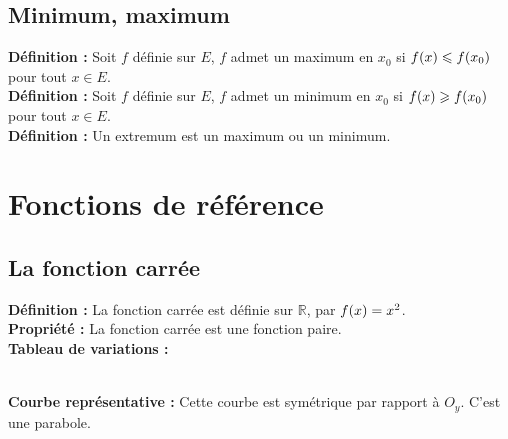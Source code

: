 \documentclass[a4paper,titlepage]{article}
\makeatletter
\let\oldsection\section
\renewcommand\section{\clearpage\oldsection}
\let\oldleft\left
\renewcommand{\left}{\mathopen{}\mathclose\bgroup\oldleft}
\let\oldright\right
\renewcommand{\right}{\aftergroup\egroup\oldright}
\def\tikzscale{1}\begin{lrbox}{\measure@tikzpicture}
\edef\tikzscale{\pgfmathresult}
\makeatother
\begin{document}
    \subsection{Minimum, maximum}
        \textbf{Définition :} Soit $f$ définie sur $E$, $f$ admet un maximum en $x_{0}$ si $f\left(x\right)\leqslant f\left(x_{0}\right)$ pour tout $x\in E$.
        \\
        \textbf{Définition :} Soit $f$ définie sur $E$, $f$ admet un minimum en $x_{0}$ si $f\left(x\right)\geqslant f\left(x_{0}\right)$ pour tout $x\in E$.
        \\
        \textbf{Définition :} Un extremum est un maximum ou un minimum.
\section{Fonctions de référence}
    \subsection{La fonction carrée}
        \textbf{Définition :} La fonction carrée est définie sur $\mathbb{R}$, par $f\left(x\right)=x^{2}$.
        \\
        \textbf{Propriété :} La fonction carrée est une fonction paire.
        \\
        \textbf{Tableau de variations :}
        \\
        \begin{scaletikzpicturetowidth}{\textwidth}
        \end{scaletikzpicturetowidth}
        \\
        \textbf{Courbe représentative :} Cette courbe est symétrique par rapport à $O_{y}$. C’est une parabole.
        \\
        \begin{center}
        \end{center}
    \clearpage
\end{document}

